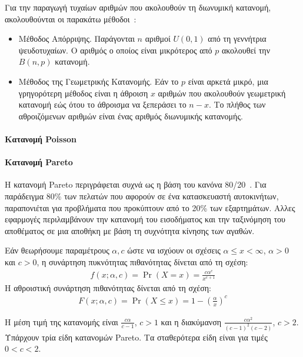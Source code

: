 \documentclass[12pt]{report}
\begin{document}
Για την παραγωγή τυχαίων αριθμών που ακολουθούν τη διωνυμική κατανομή, ακολουθούνται οι παρακάτω μέθοδοι~\cite{book:07}:
\begin{itemize}
  \item Μέθοδος Απόρριψης. Παράγονται \(n\) αριθμοί \(U(0, 1)\) από τη γεννήτρια ψευδοτυχαίων. Ο αριθμός ο οποίος είναι μικρότερος από \(p\) ακολουθεί την \(B(n, p)\) κατανομή.
  \item Μέθοδος της Γεωμετρικής Κατανομής. Εάν το \(p\) είναι αρκετά μικρό, μια γρηγορότερη μέθοδος είναι η άθροιση \(x\) αριθμών που ακολουθούν γεωμετρική κατανομή εώς ότου το άθροισμα να ξεπεράσει το \(n-x\). Το πλήθος των αθροιζόμενων αριθμών είναι ένας αριθμός διωνυμικής κατανομής.
\end{itemize}

\paragraph{Κατανομή \textlatin{Poisson}}


\paragraph{Κατανομή \textlatin{Pareto}}
Η κατανομή \textlatin{Pareto} περιγράφεται συχνά ως η βάση του κανόνα 80/20~\cite{book:07}. Για παράδειγμα 80\% των πελατών που αφορούν σε ένα κατασκευαστή αυτοκινήτων, παραπονιέται για προβλήματα που προκύπτουν από το 20\% των εξαρτημάτων. Αλλες εφαρμογές περιλαμβάνουν την κατανομή του εισοδήματος και την ταξινόμηση του αποθέματος σε μια αποθήκη με βάση τη συχνότητα κίνησης των αγαθών.

Εάν θεωρήσουμε παραμέτρους \(\alpha, c\) ώστε να ισχύουν οι σχέσεις \(\alpha \leq x < \infty\), \(\alpha > 0\) και \(c > 0\), η συνάρτηση πυκνότητας πιθανότητας δίνεται από τη σχέση:
\begin{align*}
f(x;\alpha,c)=\Pr(X=x)=\frac{c \alpha ^{c}}{x^{c+1}}
\end{align*}
Η αθροιστική συνάρτηση πιθανότητας δίνεται από τη σχέση:
\begin{align*}
F(x;\alpha,c)=\Pr(X \leq x)=1-\left(\frac{\alpha}{x}\right)^{c}
\end{align*}

Η μέση τιμή της κατανομής είναι \(\frac{c \alpha}{c-1}\), \(c>1\) και η διακύμανση \(\frac{c \alpha ^2}{(c-1)^2(c-2)}\), \(c>2\). Υπάρχουν τρία είδη κατανομών \textlatin{Pareto}. Τα σταθερότερα είδη είναι για τιμές \(0<c<2\).
\end{document}
